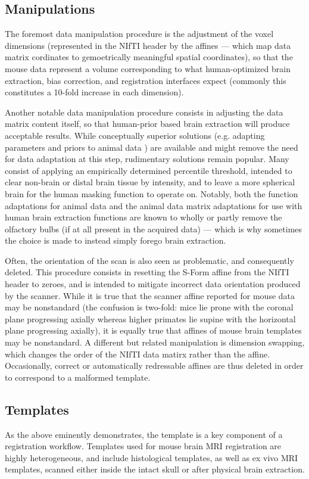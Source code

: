 \subsection{Manipulations}
The foremost data manipulation procedure is the adjustment of the voxel dimensions
(represented in the NIfTI header \cite{nifti} by the affines --- which map data matrix cordinates to gemoetrically meaningful spatial coordinates),
so that the mouse data represent a volume corresponding to what human-optimized brain extraction, bias correction, and registration interfaces expect (commonly this constitutes a 10-fold increase in each dimension).

Another notable data manipulation procedure consists in adjusting the data matrix content itself, so that human-prior based brain extraction will produce acceptable results.
While conceptually superior solutions (e.g. adapting parameters and priors to animal data \cite{rbet,Oguz2014}) are available and might remove the need for data adaptation at this step, rudimentary solutions remain popular.
Many consist of applying an empirically determined percentile threshold, intended to clear non-brain or distal brain tissue by intensity, and to leave a more spherical brain for the human masking function to operate on.
Notably, both the function adaptations for animal data and the animal data matrix adaptations for use with human brain extraction functions are known to wholly or partly remove the olfactory bulbs (if at all present in the acquired data) --- which is why sometimes the choice is made to instead simply forego brain extraction.

Often, the orientation of the scan is also seen as problematic, and consequently deleted.
This procedure consists in resetting the S-Form affine from the NIfTI header to zeroes, and is intended to mitigate incorrect data orientation produced by the scanner.
While it is true that the scanner affine reported for mouse data may be nonstandard (the confusion is two-fold: mice lie prone with the coronal plane progressing axially whereas higher primates lie supine with the horizontal plane progressing axially), it is equally true that affines of mouse brain templates may be nonstandard.
A different but related manipulation is dimension swapping, which changes the order of the NIfTI data matirx rather than the affine.
Occasionally, correct or automatically redressable affines are thus deleted in order to correspond to a malformed template.

\subsection{Templates}
As the above eminently demonstrates, the template is a key component of a registration workflow.
Templates used for mouse brain MRI registration are highly heterogeneous, and include histological templates, as well as ex vivo MRI templates, scanned either inside the intact skull or after physical brain extraction.

